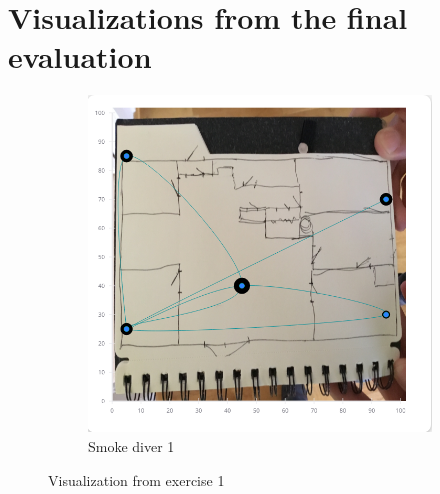 \documentclass[../Main/thesis.tex]{subfiles}
\begin{document}
\chapter{Visualizations from the final evaluation}
\label{app:visualizations}

\begin{figure}[h]
	\centering
	\begin{subfigure}{0.45\textwidth}
		\includegraphics[width=\textwidth]{../fig/eval_1_remi}
		\caption{Smoke diver 1}
		\label{fig:eval-visualization-1-1-app}
	\end{subfigure}
	\caption{Visualization from exercise 1}
	\label{fig:eval-visualization-1-app}
\end{figure}
\end{document}
